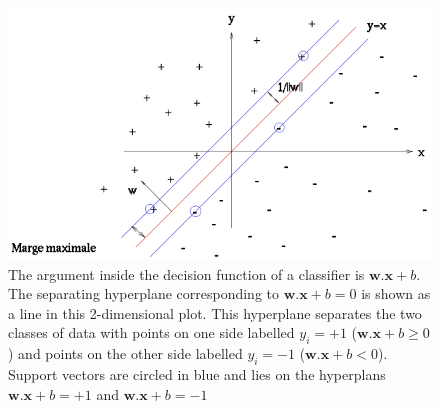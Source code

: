 \begin{figure}[h!]
\centering
\includegraphics[width=0.6\linewidth]{images/Separatrice_lineaire_avec_marges}
\caption{The argument inside the decision function of a classifier is $\textbf{w}.\textbf{x} + b$. The separating hyperplane corresponding to $\textbf{w}.\textbf{x} + b = 0$ is shown as a line in this 2-dimensional plot. This hyperplane separates the two classes of data with points on one side labelled $y_i = +1$ ($\textbf{w}.\textbf{x} + b \geq 0$) and points on the other side labelled $y_i=-1$ ($\textbf{w}.\textbf{x} + b < 0$). Support vectors are circled in blue and lies on the hyperplans $\textbf{w}.\textbf{x} + b = +1$ and $\textbf{w}.\textbf{x} + b = -1$}
\label{fig:Separatrice_lineaire_avec_marges}
\end{figure}




